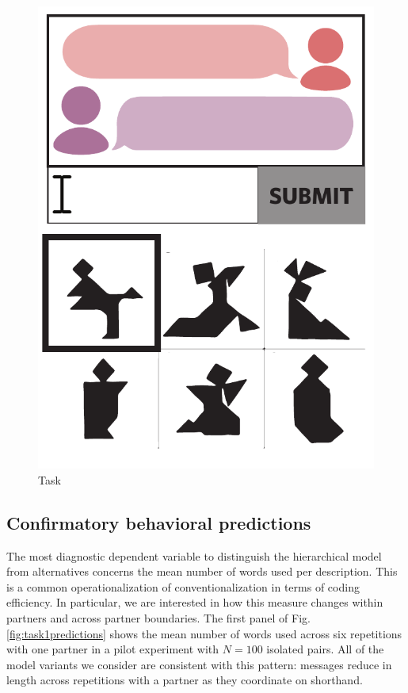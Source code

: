 \documentclass[11pt, floatsintext]{apa6}
\begin{document}
\begin{figure}
\centering
    \includegraphics[scale=.27]{task1_display.pdf}
  \caption{Task}%
  \label{fig:task1_display}
\end{figure}


\subsection{Confirmatory behavioral predictions}
The most diagnostic dependent variable to distinguish the hierarchical model from alternatives concerns the mean number of words used per description.
This is a common operationalization of conventionalization in terms of coding efficiency.
In particular, we are interested in how this measure changes within partners and across partner boundaries.
The first panel of Fig. \ref{fig:task1predictions} shows the mean number of words used across six repetitions with one partner in a pilot experiment with $N=100$ isolated pairs.
All of the model variants we consider are consistent with this pattern: messages reduce in length across repetitions with a partner as they coordinate on shorthand. 
\end{document}
